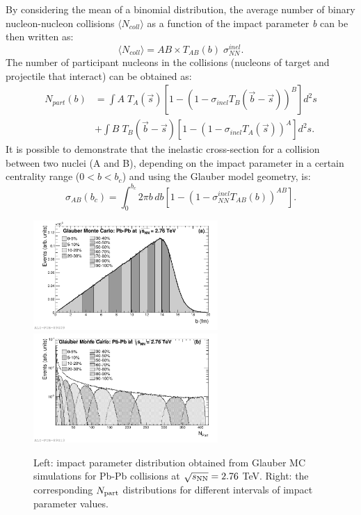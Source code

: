 By considering the mean of a binomial distribution, the average number of binary nucleon-nucleon collisions $\langle N_{coll}\rangle$ as a function of the impact parameter \textit{b} can be then written as:
\begin{equation}
\langle N_{coll}\rangle = AB \times T_{AB}(b)\; \sigma^{inel}_{NN}.
\end{equation}
The number of participant nucleons in the collisions (nucleons of target and projectile that interact) can be obtained as:
\begin{equation}
\begin{aligned}
N_{part} (b) &= \int A \; T_A(\vec{s}) [1- (1- \sigma_{inel} T_B(\vec{b}-\vec{s}))^B]d^2s \\
& + \int B \; T_B(\vec{b}-\vec{s}) [1- (1- \sigma_{inel} T_A(\vec{s}))^A]d^2s.
\end{aligned}
\end{equation}
It is possible to demonstrate that the inelastic cross-section for a collision between two nuclei (A and B), depending on the impact parameter in a certain centrality range ($0 < b < b_c$) and using the Glauber model geometry, is:
\begin{equation}
\label{eq:sigmaABGlauber}
\sigma_{AB}(b_c) = \int_0^{b_c} 2\pi b\,db [1 - (1 - \sigma^{inel}_{NN}T_{AB}(b))^{AB}]. %
\end{equation}

\begin{figure}[!t]
\centering
\includegraphics[width=7cm]{FigCap1/Glauberimpactpar.pdf}
\includegraphics[width=7cm]{FigCap1/GlauberNpart.pdf}
\caption{Left: impact parameter distribution obtained from Glauber MC simulations for Pb-Pb collisions at $\sqrt{s_{\rm NN}} = 2.76$ TeV. Right: the corresponding $N_{\rm part}$ distributions for different intervals of impact parameter values.}
\label{fig:glaubMC}
\end{figure}
